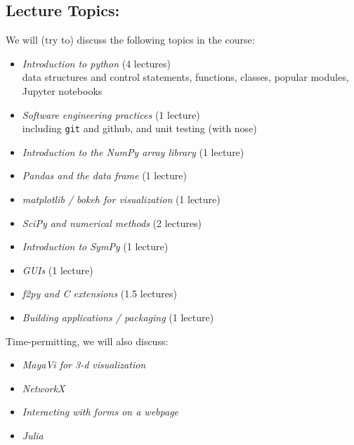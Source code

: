 \documentclass[11pt]{article}
\newenvironment{itemsquish}
  { \begin{itemize}
    \addtolength{\itemsep}{-0.25\baselineskip}
    \addtolength{\baselineskip}{-0.25\baselineskip} }
  { \end{itemize} }
\begin{document}
\subsection*{Lecture Topics:} 

We will (try to) discuss the following topics in the course:
%
\begin{itemsquish}
\item {\em Introduction to python} (4 lectures) \\ data structures and
  control statements, functions, classes, popular modules, Jupyter
  notebooks

\item {\em Software engineering practices} (1 lecture) \\
  including {\tt git} and github, and unit testing (with nose)

\item {\em Introduction to the NumPy array library} (1 lecture)

\item {\em Pandas and the data frame} (1 lecture) 

\item {\em matplotlib / bokeh for visualization} (1 lecture)

\item {\em SciPy and numerical methods} (2 lectures)

\item {\em Introduction to SymPy} (1 lecture)

\item {\em GUIs} (1 lecture)

\item {\em f2py and C extensions} (1.5 lectures)

\item {\em Building applications / packaging} (1 lecture)
\end{itemsquish}

\noindent Time-permitting, we will also discuss:
\begin{itemsquish}
\item {\em MayaVi for 3-d visualization} 

\item {\em NetworkX}

\item {\em Interacting with forms on a webpage}

\item {\em Julia}
\end{itemsquish}
\end{document}
